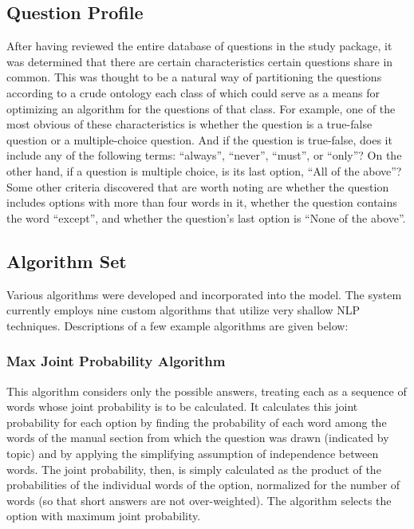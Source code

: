 \subsection{Question Profile}

After having reviewed the entire database of questions in the study package, it was determined that there are certain characteristics certain questions share in common.  This was thought to be a natural way of partitioning the questions according to a crude ontology each class of which could serve as a means for optimizing an algorithm for the questions of that class.  For example, one of the most obvious of these characteristics is whether the question is a true-false question or a multiple-choice question.  And if the question is true-false, does it include any of the following terms:  ``always'', ``never'', ``must'', or ``only''?  On the other hand, if a question is multiple choice, is its last option, ``All of the above''?  Some other criteria discovered that are worth noting are whether the question includes options with more than four words in it, whether the question contains the word ``except'', and whether the question's last option is ``None of the above''.

\subsection{Algorithm Set}

Various algorithms were developed and incorporated into the model.  The system currently employs nine custom algorithms that utilize very shallow NLP techniques.  Descriptions of a few example algorithms are given below:

\subsubsection{Max Joint Probability Algorithm}

This algorithm considers only the possible answers, treating each as a sequence of words whose joint probability is to be calculated.  It calculates this joint probability for each option by finding the probability of each word among the words of the manual section from which the question was drawn (indicated by topic) and by applying the simplifying assumption of independence between words.  The joint probability, then, is simply calculated as the product of the probabilities of the individual words of the option, normalized for the number of words (so that short answers are not over-weighted).  The algorithm selects the option with maximum joint probability.

